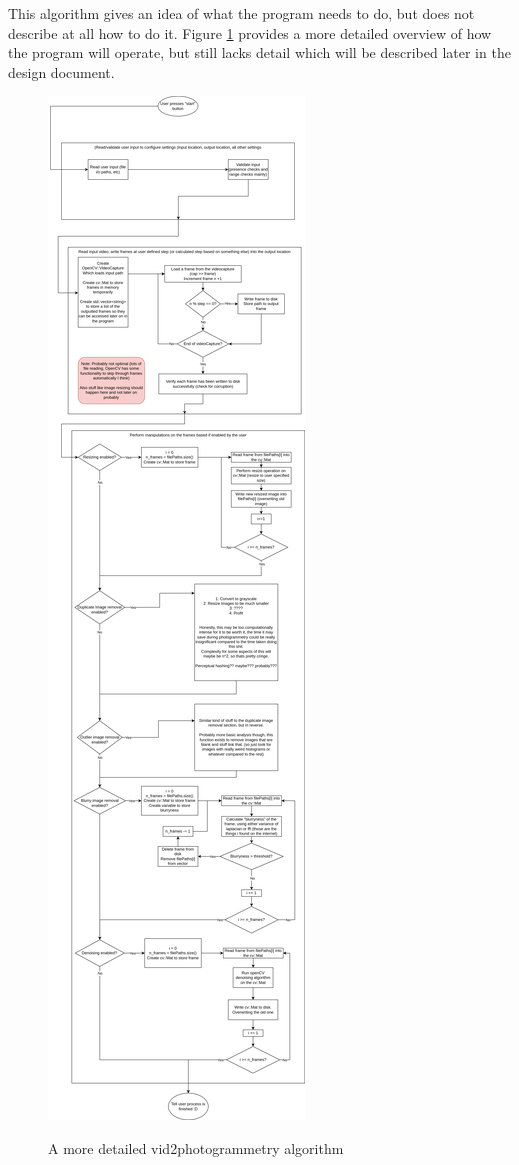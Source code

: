 \documentclass[11pt]{report}
\begin{document}
\newpage
This algorithm gives an idea of what the program needs to do, but does not describe at all how to do it. Figure \ref{fig:detailedOverallAlgorithm} provides a more detailed overview of how the program will operate, but still lacks detail which will be described later in the design document.
\begin{figure}
	\centering
	\caption{A more detailed vid2photogrammetry algorithm}
	\includegraphics[height=0.6\paperheight]{designDiagrams/detailedOverallAlgorithm}
	\label{fig:detailedOverallAlgorithm}
\end{figure}\\\\
\newpage
\end{document}
